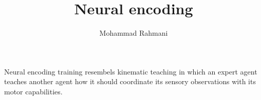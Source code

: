 \documentclass[a4paper]{article}
\title{Neural encoding}
\date{}
\author{Mohammad Rahmani}
\begin{document}
\maketitle
    Neural encoding training resembels kinematic teaching \cite{ablett-2025-multimodal-and-force-matched-imitation-learning-with-a-see-through-visuotactile-sensor} in which an expert agent teaches another agent how it should coordinate its sensory observations with its motor capabilities.


    
    
\end{document}

